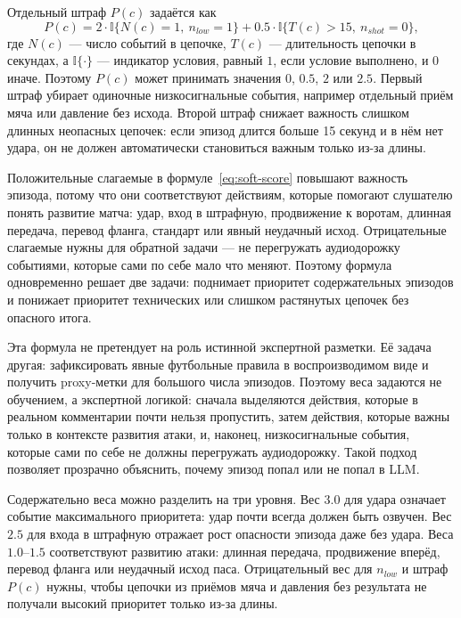 \documentclass[a4paper,14pt]{extarticle}
\numberwithin{table}{section}
\numberwithin{figure}{section}
\numberwithin{equation}{section}
\begin{document}
Отдельный штраф $P(c)$ задаётся как
\begin{equation}
P(c) = 2 \cdot \mathbb{I}\{N(c)=1,\ n_{low}=1\} + 0.5 \cdot \mathbb{I}\{T(c)>15,\ n_{shot}=0\},
\label{eq:soft-penalty}
\end{equation}
где $N(c)$ --- число событий в цепочке, $T(c)$ --- длительность цепочки в секундах, а $\mathbb{I}\{\cdot\}$ --- индикатор условия, равный $1$, если условие выполнено, и $0$ иначе. Поэтому $P(c)$ может принимать значения $0$, $0.5$, $2$ или $2.5$. Первый штраф убирает одиночные низкосигнальные события, например отдельный приём мяча или давление без исхода. Второй штраф снижает важность слишком длинных неопасных цепочек: если эпизод длится больше 15 секунд и в нём нет удара, он не должен автоматически становиться важным только из-за длины.

Положительные слагаемые в формуле~\eqref{eq:soft-score} повышают важность эпизода, потому что они соответствуют действиям, которые помогают слушателю понять развитие матча: удар, вход в штрафную, продвижение к воротам, длинная передача, перевод фланга, стандарт или явный неудачный исход. Отрицательные слагаемые нужны для обратной задачи --- не перегружать аудиодорожку событиями, которые сами по себе мало что меняют. Поэтому формула одновременно решает две задачи: поднимает приоритет содержательных эпизодов и понижает приоритет технических или слишком растянутых цепочек без опасного итога.

Эта формула не претендует на роль истинной экспертной разметки. Её задача другая: зафиксировать явные футбольные правила в воспроизводимом виде и получить proxy-метки для большого числа эпизодов. Поэтому веса задаются не обучением, а экспертной логикой: сначала выделяются действия, которые в реальном комментарии почти нельзя пропустить, затем действия, которые важны только в контексте развития атаки, и, наконец, низкосигнальные события, которые сами по себе не должны перегружать аудиодорожку. Такой подход позволяет прозрачно объяснить, почему эпизод попал или не попал в LLM.

Содержательно веса можно разделить на три уровня. Вес $3.0$ для удара означает событие максимального приоритета: удар почти всегда должен быть озвучен. Вес $2.5$ для входа в штрафную отражает рост опасности эпизода даже без удара. Веса $1.0$--$1.5$ соответствуют развитию атаки: длинная передача, продвижение вперёд, перевод фланга или неудачный исход паса. Отрицательный вес для $n_{low}$ и штраф $P(c)$ нужны, чтобы цепочки из приёмов мяча и давления без результата не получали высокий приоритет только из-за длины.
\end{document}
